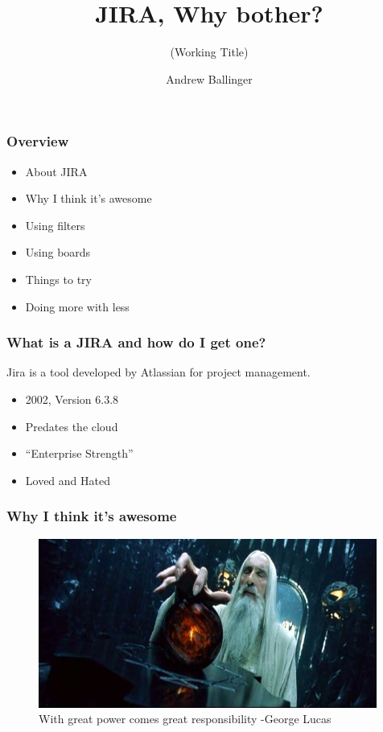 \documentclass{beamer}
\title{ JIRA, Why bother? }
\subtitle{(Working Title)}
\author{Andrew Ballinger}
\begin{document}
\frame{\titlepage}

\begin{frame}[fragile]
\frametitle{Overview}

\begin{itemize}
  \item{About JIRA}
  \item{Why I think it's awesome}
  \item{Using filters}
  \item{Using boards}
  \item{Things to try}
  \item{Doing more with less}
\end{itemize}

\end{frame}

\begin{frame}[fragile]
  
\frametitle{What is a JIRA and how do I get one?}
Jira is a tool developed by Atlassian for project management.

\begin{itemize}
  \item{2002, Version 6.3.8}
  \item{Predates the cloud}
  \item{``Enterprise Strength''}
  \item{Loved and Hated}
\end{itemize}

\end{frame}


\begin{frame}[fragile]
  
\frametitle{Why I think it's awesome}
\begin{figure}[p]
  \centering
  \includegraphics[height=15em]{palantir.jpg}
  \caption{With great power comes great responsibility -George Lucas}
\end{figure}

\end{frame}
\end{document}

